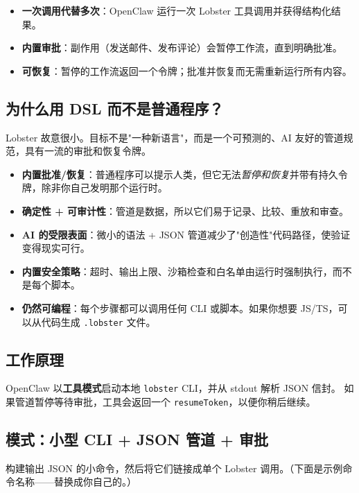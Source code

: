 \begin{itemize}
  \item \textbf{一次调用代替多次}：OpenClaw 运行一次 Lobster 工具调用并获得结构化结果。
  \item \textbf{内置审批}：副作用（发送邮件、发布评论）会暂停工作流，直到明确批准。
  \item \textbf{可恢复}：暂停的工作流返回一个令牌；批准并恢复而无需重新运行所有内容。
\end{itemize}


\subsection{为什么用 DSL 而不是普通程序？}


Lobster 故意很小。目标不是"一种新语言"，而是一个可预测的、AI 友好的管道规范，具有一流的审批和恢复令牌。

\begin{itemize}
  \item \textbf{内置批准/恢复}：普通程序可以提示人类，但它无法\textit{暂停和恢复}并带有持久令牌，除非你自己发明那个运行时。
  \item \textbf{确定性 + 可审计性}：管道是数据，所以它们易于记录、比较、重放和审查。
  \item \textbf{AI 的受限表面}：微小的语法 + JSON 管道减少了"创造性"代码路径，使验证变得现实可行。
  \item \textbf{内置安全策略}：超时、输出上限、沙箱检查和白名单由运行时强制执行，而不是每个脚本。
  \item \textbf{仍然可编程}：每个步骤都可以调用任何 CLI 或脚本。如果你想要 JS/TS，可以从代码生成 \texttt{.lobster} 文件。
\end{itemize}


\subsection{工作原理}


OpenClaw 以\textbf{工具模式}启动本地 \texttt{lobster} CLI，并从 stdout 解析 JSON 信封。
如果管道暂停等待审批，工具会返回一个 \texttt{resumeToken}，以便你稍后继续。

\subsection{模式：小型 CLI + JSON 管道 + 审批}


构建输出 JSON 的小命令，然后将它们链接成单个 Lobster 调用。（下面是示例命令名称——替换成你自己的。）

